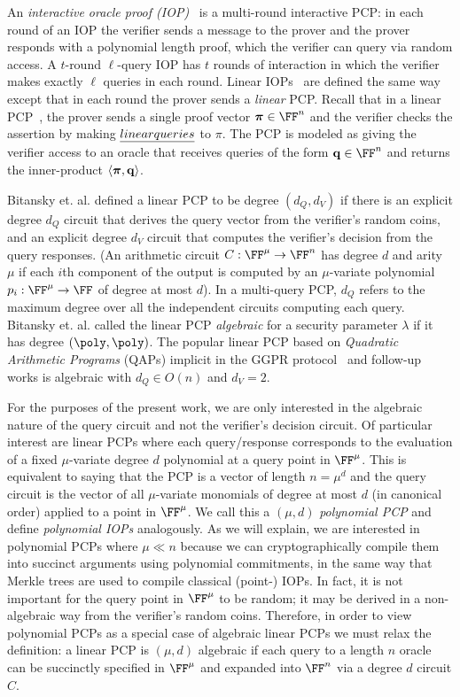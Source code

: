 An \emph{interactive oracle proof (IOP)}~\cite{TCC:BenChiSpo16,STOC:ReiRotRot16} is a multi-round interactive PCP: in each round of an IOP the verifier sends a message to the prover and the prover responds with a polynomial length proof, which the verifier can query via random access. A $t$-round $\ell$-query IOP has $t$ rounds of interaction in which the verifier makes exactly $\ell$ queries in each round. Linear IOPs~\cite{C:BBCGI19} are defined the same way except that in each round the prover sends a \emph{linear} PCP. Recall that in a linear PCP~\cite{CC:IKO07}, the prover sends a single proof vector $\proofO \in \FF^n$ %
and the verifier checks the assertion by making $\emph{linear queries}$ to $\pi$. The PCP is modeled as giving the verifier access to an oracle that receives queries of the form $\mathbf{q} \in \FF^n$ and returns the inner-product $\langle \boldsymbol{\pi}, \mathbf{q} \rangle$. 

Bitansky et. al. \cite{TCC:BCIOP13} defined a linear PCP to be degree $(d_Q, d_V)$ if there is an explicit degree $d_Q$ circuit that derives the query vector from the verifier's random coins, and an explicit degree $d_V$ circuit that computes the verifier's decision from the query responses. (An arithmetic circuit $C: \FF^\mu \rightarrow \FF^n$ has degree $d$ and arity $\mu$ if each $i$th component of the output is computed by an $\mu$-variate polynomial $p_i: \FF^\mu \rightarrow \FF$ of degree at most $d$). In a multi-query PCP, $d_Q$ refers to the maximum degree over all the independent circuits computing each query. Bitansky et. al. called the linear PCP \emph{algebraic} for a security parameter $\lambda$ if it has degree $(\poly, \poly)$. The popular linear PCP based on \emph{Quadratic Arithmetic Programs} (QAPs) implicit in the GGPR protocol~\cite{EC:GGPR13} and follow-up works is algebraic with $d_Q \in O(n)$ and $d_V = 2$.  

For the purposes of the present work, we are only interested in the algebraic nature of the query circuit and not the verifier's decision circuit. Of particular interest are linear PCPs where each query/response corresponds to the evaluation of a fixed $\mu$-variate degree $d$ polynomial at a query point in $\FF^\mu$. This is equivalent to saying that the PCP is a vector of length $n = \mu^d$ and the query circuit is the vector of all $\mu$-variate monomials of degree at most $d$ (in canonical order) applied to a point in $\FF^\mu$. We call this a $(\mu, d)$ \emph{polynomial PCP} and define \emph{polynomial IOPs} analogously. As we will explain, we are interested in polynomial PCPs where $\mu \ll n$ because we can cryptographically compile them into succinct arguments using polynomial commitments, in the same way that Merkle trees are used to compile classical (point-) IOPs. In fact, it is not important for the query point in $\FF^\mu$ to be random; it may be derived in a non-algebraic way from the verifier's random coins. Therefore, in order to view polynomial PCPs as a special case of algebraic linear PCPs we must relax the definition: a linear PCP is $(\mu, d)$ algebraic if each query to a length $n$ oracle can be succinctly specified in $\FF^\mu$ and expanded into $\FF^n$ via a degree $d$ circuit $C$. 


